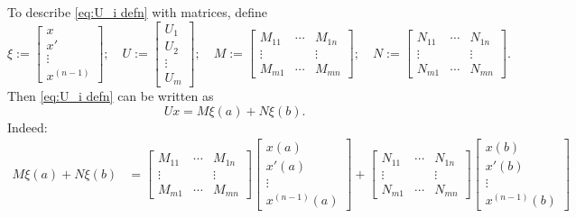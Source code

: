 \documentclass[10.5pt, oneside, a4paper]{article}
\begin{document}
\begin{rmk}\label{rmk:writing Ux in M, N (M:N)}
    To describe \eqref{eq:U_i defn} with matrices, define
    \[
        \xi:= \begin{bmatrix}x\\ x'\\ \vdots \\ x^{(n-1)}
        \end{bmatrix};
            \quad
        U := \begin{bmatrix}U_1\\ U_2\\ \vdots \\ U_m
        \end{bmatrix};
            \quad
        M := \begin{bmatrix}
            M_{11} & \cdots & M_{1n}\\
            \vdots &  & \vdots\\
            M_{m1} & \cdots & M_{mn}
        \end{bmatrix};
        \quad
        N := \begin{bmatrix}
            N_{11} & \cdots & N_{1n}\\
            \vdots &  & \vdots\\
            N_{m1} & \cdots & N_{mn}
        \end{bmatrix}.
    \]
    Then \eqref{eq:U_i defn} can be written as
    \[Ux = M\xi(a) + N\xi(b).\]
    {\color{blue}
    Indeed:
    \begin{align*}
        M\xi(a) + N\xi(b) &= \begin{bmatrix}
            M_{11} & \cdots & M_{1n}\\
            \vdots &  & \vdots\\
            M_{m1} & \cdots & M_{mn}
        \end{bmatrix}\begin{bmatrix}x(a)\\ x'(a)\\ \vdots \\ x^{(n-1)}(a)
            \end{bmatrix} + \begin{bmatrix}
                N_{11} & \cdots & N_{1n}\\
                \vdots &  & \vdots\\
                N_{m1} & \cdots & N_{mn}
            \end{bmatrix}\begin{bmatrix}x(b)\\ x'(b)\\ \vdots \\ x^{(n-1)}(b)

\end{bmatrix}
\end{align*}}
\end{rmk}
\end{document}
